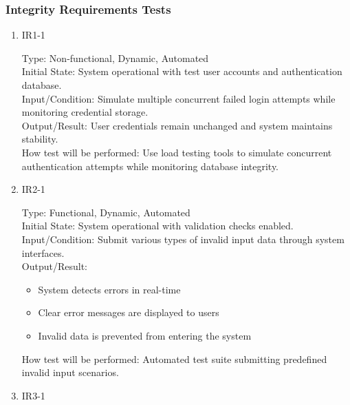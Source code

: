 \documentclass[12pt, titlepage]{article}
\begin{document}
\subsubsection{Integrity Requirements Tests}
\begin{enumerate}
    \item{IR1-1\\}
    
    Type: Non-functional, Dynamic, Automated\\
    
    Initial State: System operational with test user accounts and authentication database.\\
    
    Input/Condition: Simulate multiple concurrent failed login attempts while monitoring credential storage.\\
    
    Output/Result: User credentials remain unchanged and system maintains stability.\\
    
    How test will be performed: Use load testing tools to simulate concurrent authentication attempts while monitoring database integrity.

    \item{IR2-1\\}
    
    Type: Functional, Dynamic, Automated\\
    
    Initial State: System operational with validation checks enabled.\\
    
    Input/Condition: Submit various types of invalid input data through system interfaces.\\
    
    Output/Result: 
    \begin{itemize}
        \item System detects errors in real-time
        \item Clear error messages are displayed to users
        \item Invalid data is prevented from entering the system
    \end{itemize}
    
    How test will be performed: Automated test suite submitting predefined invalid input scenarios.

    \item{IR3-1\\}
    

\end{enumerate}
\end{document}
